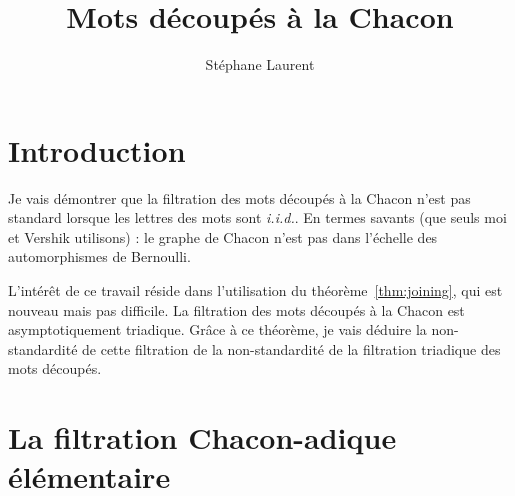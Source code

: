 \documentclass[12pt,a4paper]{article}
\author{Stéphane Laurent}
\title{Mots découpés à la Chacon}
\begin{document}
\newcommand{\DD}{\EuScript{D}}
\newcommand{\FF}{\EuScript{F}}
\newcommand{\GG}{\EuScript{G}}
\renewcommand{\SS}{\EuScript{S}}
\newcommand{\C}{\mathbb{C}}
\newcommand{\EE}{\mathbb{E}}
\newcommand{\N}{\mathbb{N}}
\newcommand{\PP}{\mathbb{P}}
\newcommand{\R}{\mathbb{R}}
\newcommand{\Z}{\mathbb{Z}}
\newcommand{\given}{\mid}
\newcommand{\indic}{\boldsymbol 1}

\theoremstyle{thmstyle}
\newtheorem{thm}{Th\'eor\`eme}
\newtheorem{lemme}{Lemme}
\newtheorem{ppsition}{Proposition}
\theoremstyle{defstyle}
\newtheorem{definition}{D\'efinition}

\maketitle 


\tableofcontents

\newpage

\section{Introduction} 

Je vais démontrer que la filtration des mots découpés à la Chacon 
n'est pas standard lorsque les lettres des mots sont \emph{i.i.d.}. 
En termes savants (que seuls moi et Vershik utilisons) : le graphe de 
Chacon n'est pas dans l'échelle des automorphismes de Bernoulli. 

L'intérêt de ce travail réside dans l'utilisation du théorème~\ref{thm:joining}, 
qui est nouveau mais pas difficile. 
La filtration des mots découpés à la Chacon est asymptotiquement triadique. 
Grâce à ce théorème, je vais déduire la non-standardité de cette filtration 
de la non-standardité de la filtration triadique des mots découpés. 

\section{La filtration Chacon-adique élémentaire}
\end{document}
